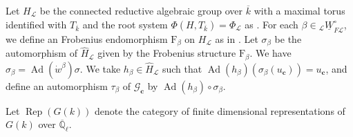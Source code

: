 \documentclass[12pt,a4paper]{article}
\DeclareMathOperator{\Rep}{Rep}
\DeclareMathOperator{\Ad}{Ad}
\newcommand{\mb}{\mathbb}
\newcommand{\mc}{\mathcal}
\newcommand{\mr}{\mathrm}
\newcommand{\mf}{\mathfrak}
\newcommand{\mbf}{\mathbf}
\newcommand{\ol}{\overline}
\newcommand{\ul}{\underline}
\newcommand{\wh}{\widehat}
\begin{document}
Let $H_{\mc{L}}$ be the connected reductive algebraic group over $\ol{k}$ with a maximal torus identified with $T_{\ol{k}}$ and the root system $\Phi (H,T_{\ol{k}})=\Phi_{\mc{L}}$ as \cite[9.1]{LuYuEndHecchv3}. 
For each $\beta \in {}_{\mc{L}}\ul{W}^{\circ}_{F\mc{L}}$, we define an Frobenius endomorphism $\mr{F}_{\beta}$ on $H_{\mc{L}}$ as in \cite[12.1]{LuYuEndHecchv3}. 
Let $\sigma_{\beta}$ be the automorphism of $\wh{H}_{\mc{L}}$ given by the Frobenius structure $\mr{F}_{\beta}$. We have $\sigma_{\beta}=\Ad (\dot{w}^{\beta}) \sigma$. 
We take $h_{\beta} \in \wh{H}_{\mc{L}}$ such that $\Ad (h_{\beta})(\sigma_{\beta} (u_{\mbf{c}}))= u_{\mbf{c}}$, and define an automorphism $\tau_{\beta}$ of $\mc{G}_{\mbf{c}}$ by $\Ad (h_{\beta}) \circ \sigma_{\beta}$. 

Let $\Rep (G(k))$ denote the category of finite dimensional representations of $G(k)$ over $\ol{\mb{Q}}_{\ell}$. 
\end{document}
